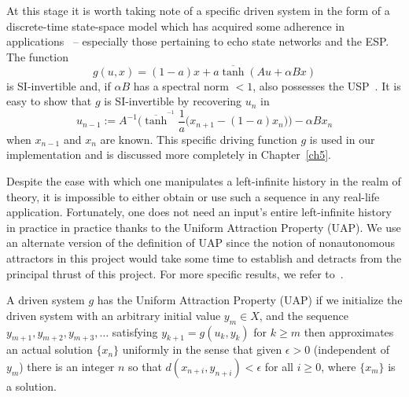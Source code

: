 
At this stage it is worth taking note of a specific driven system in the form of a discrete-time state-space model which has acquired some adherence in applications~\cite{Manju_IEEE} -- especially those pertaining to echo state networks and the ESP. The function 
\begin{equation}  \label{eqn_driving}
  g(u,x) = (1-a)x + a\overline{\tanh}(Au + \alpha Bx)
\end{equation} 
is SI-invertible and, if $\alpha B$ has a spectral norm $<1$, also possesses the USP~\cite[Theorem.2]{manjunath2013echo}. 
It is easy to show that $g$ is SI-invertible by recovering $u_n$ in 
\begin{equation} \label{eqn_SI_RNN}
  u_{n-1} := A^{-1}\bigg(\overline{\tanh}^{^{-1}}\frac{1}{a}\Big(x_{n+1}-(1-a)x_n\Big) \bigg) - \alpha B x_n
  \end{equation}
  when $x_{n-1}$ and $x_n$ are known.
This specific driving function $g$ is used in our implementation and is discussed more completely in Chapter~\ref{ch5}.

Despite the ease with which one manipulates a left-infinite history in the realm of theory, it is impossible to either obtain or use such a sequence in any real-life application.
Fortunately, one does not need an input's entire left-infinite history in practice in practice thanks to the Uniform Attraction Property (UAP). 
We use an alternate version of the definition of UAP since the notion of nonautonomous attractors in this project would take some time to establish and detracts from the principal thrust of this project. 
For more specific results, we refer to~\cite{Manju_Nonlinearity}. 

\begin{Definition}
  \label{Dfn_UAP}\rm
  A driven system $g$ has the Uniform Attraction Property (UAP) if we initialize the driven system
with an arbitrary initial value $y_m \in X$, and the sequence $y_{m+1}, y_{m+2}, y_{m+3},\ldots$ satisfying $y_{k+1}= g(u_k,y_k)$ for $k \geq m$ then approximates an actual solution $\{x_n\}$ uniformly in the sense that given $\epsilon>0$ (independent of $y_m$) there is an integer $n$ so that $d(x_{n+i}, y_{n+i})<\epsilon$ for all $i\ge 0$, where $\{x_m\}$ is a solution.
\end{Definition}

